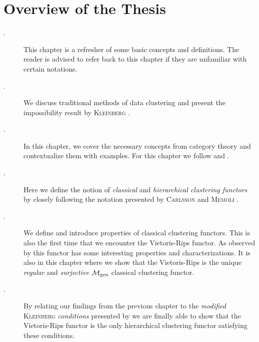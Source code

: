 \section*{Overview of the Thesis}
\begin{description}
    \item[.] This chapter is a refresher of some basic concepts and definitions. The reader is advised to refer back to this chapter if they are unfamiliar with certain notations.

    \item[.] We discuss traditional methods of data clustering and present the impossibility result by \textsc{Kleinberg} \cite{Kleinberg2002}.

    \item[.] In this chapter, we cover the necessary concepts from category theory and contextualize them with examples. For this chapter we follow \cite{Roman2017} and \cite{Leinster2014-dc}.

    \item[.] Here we define the notion of \emph{classical} and \emph{hierarchical clustering functors} by closely following the notation presented by \textsc{Carlsson} and \textsc{Memoli} \cite{Carlsson2010}.

    \item[.] We define and introduce properties of classical clustering functors. This is also the first time that we encounter the Vietoris-Rips functor. As observed by \cite{Carlsson2010} this functor has some interesting properties and characterizations. It is also in this chapter where we show that the Vietoris-Rips is the unique \emph{regular} and \emph{surjective} ${\mathcal{M}_\mathrm{gen}}$ classical clustering functor.

    \item[.] By relating our findings from the previous chapter to the \emph{modified} \textsc{Kleinberg} \emph{conditions} presented by \cite[Sec.~7.3.1]{Carlsson2010} we are finally able to show that the Vietoris-Rips functor is the only hierarchical clustering functor satisfying these conditions.
\end{description}

